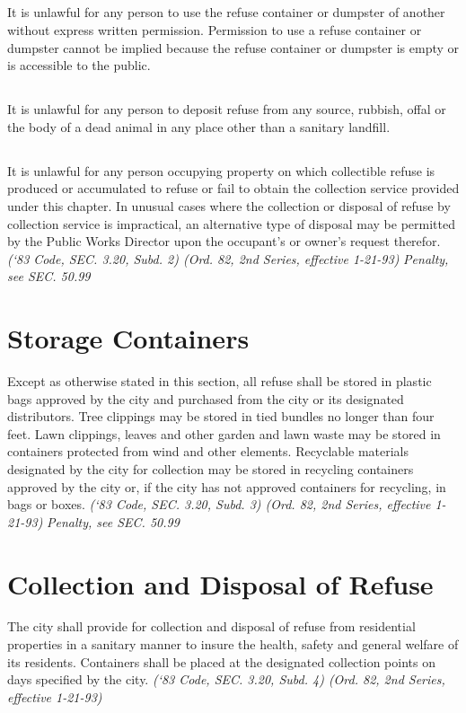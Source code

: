 \subsection{}
It is unlawful for any person to use the refuse container or dumpster of another without express written permission.  Permission to use a refuse container or dumpster cannot be implied because the refuse container or dumpster is empty or is accessible to the public.
\subsection{}
It is unlawful for any person to deposit refuse from any source, rubbish, offal or the body of a dead animal in any place other than a sanitary landfill.
\subsection{}
It is unlawful for any person occupying property on which collectible refuse is produced or accumulated to refuse or fail to obtain the collection service provided under this chapter.  In unusual cases where the collection or disposal of refuse by collection service is impractical, an alternative type of disposal may be permitted by the Public Works Director upon the occupant’s or owner’s request therefor.\newline
\emph{(‘83 Code, SEC. 3.20, Subd. 2) (Ord. 82, 2nd Series, effective 1-21-93)}\newline
\emph{Penalty, see SEC. 50.99}
\section{Storage Containers}
Except as otherwise stated in this section, all refuse shall be stored in plastic bags approved by the city and purchased from the city or its designated distributors.  Tree clippings may be stored in tied bundles no longer than four feet.  Lawn clippings, leaves and other garden and lawn waste may be stored in containers protected from wind and other elements.  Recyclable materials designated by the city for collection may be stored in recycling containers approved by the city or, if the city has not approved containers for recycling, in bags or boxes.\newline
\emph{(‘83 Code, SEC. 3.20, Subd. 3) (Ord. 82, 2nd Series, effective 1-21-93)}\newline
\emph{Penalty, see SEC. 50.99}
\section{Collection and Disposal of Refuse}
The city shall provide for collection and disposal of refuse from residential properties in a sanitary manner to insure the health, safety and general welfare of its residents.  Containers shall be placed at the designated collection points on days specified by the city.\newline
\emph{(‘83 Code, SEC. 3.20, Subd. 4) (Ord. 82, 2nd Series, effective 1-21-93)}
